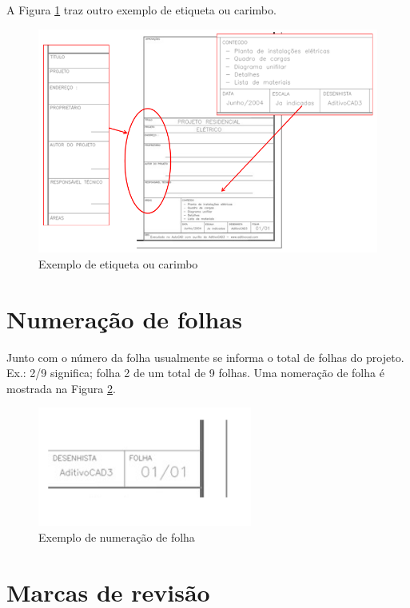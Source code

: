 \documentclass{article}
\begin{document}
\hspace{1cm} A Figura \ref{fig_ExemploEtiquetaOuCarimbo} traz outro exemplo de etiqueta ou carimbo.

\begin{figure} [H] %
\centering
\includegraphics[scale=0.8]{Fig/Figura_ExemploEtiquetaOuCarimbo.png} 
\caption{Exemplo de etiqueta ou carimbo}
\label{fig_ExemploEtiquetaOuCarimbo}
\end{figure}

\section{Numeração de folhas}

\hspace{1cm} Junto com o número da folha usualmente se informa o total de folhas do projeto. Ex.: 2/9 significa; folha 2 de um total de 9 folhas. Uma nomeração de folha é mostrada na Figura \ref{fig_NumeracaoFolhas}.

\begin{figure} [H] %
\centering
\includegraphics[scale=0.8]{Fig/Figura_ExemploNumeracaoPagina.png} 
\caption{Exemplo de numeração de folha}
\label{fig_NumeracaoFolhas}
\end{figure}

\section{Marcas de revisão}
\end{document}
